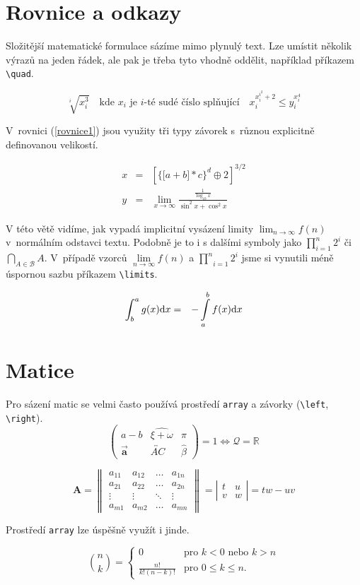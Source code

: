 \documentclass[11pt,a4paper,twocolumn]{article}
\begin{document}
\section{Rovnice a odkazy}
Složitější matematické formulace sázíme mimo plynulý
text. Lze umístit několik výrazů na jeden řádek, ale pak je
třeba tyto vhodně oddělit, například příkazem \verb|\quad|.

$$\sqrt[i]{x^{3}_{i}} \quad\text{kde $x_i$ je $i$-té sudé číslo splňující}
\quad x_{i}^{x_{i}^{i^{2}}+2} \leq y_{i}^{x_{i}^{4}}$$


V~rovnici (\ref{rovnice1}) jsou využity tři typy závorek s~různou
explicitně definovanou velikostí.

\begin{eqnarray}
\label{rovnice1}
x& = &\left[\Big\{\big[a+b\big]*c\Big\}^{d}\oplus{2}\right]^{3/2}\\
y& = &\lim_{x\rightarrow\infty}\frac{\frac{1}{\log_{10}x}}{\sin^{2}x+\cos^{2}x}\nonumber
\end{eqnarray}

V této větě vidíme, jak vypadá implicitní vysázení limity $\lim_{n\rightarrow\infty}f(n)$ v~normálním odstavci textu. Podobně
je to i s dalšími symboly jako $\prod_{i=1}^{n} 2^{i}$ či $\bigcap_{A\in\mathcal{B}}A$.
V~případě vzorců $\lim\limits_{n\rightarrow\infty}f(n)$ a $\underset{i=1}{\overset{n}{\prod}} 2^{i}$
jsme si vynutili méně
úspornou sazbu příkazem \verb|\limits|.

\begin{eqnarray}
\label{rovnice2}
\int_{b}^{a} g(x)\mathrm{d}x&=&-\int\displaylimits_a^{b} f(x) \mathrm{d}x
\end{eqnarray}

\section{Matice}
Pro sázení matic se velmi často používá prostředí \verb|array|
a závorky (\verb|\left|, \verb|\right|).
$$\left(\begin{array}{ccc}
{a-b} & \widehat{\xi+\omega} & \pi\\
{\vec{\mathbf{a}}} & \overleftrightarrow{AC} & \hat{\beta}
\end{array}\right) = 1 \Longleftrightarrow \mathcal{Q} = \mathbb{R}$$

$$\mathbf{A} = \left\|\begin{array}{cccc}
a_{11} & a_{12} & \ldots & a_{1 n}\\
a_{21} & a_{22} & \ldots & a_{2 n}\\
\vdots & \vdots & \ddots & \vdots\\
a_{m 1} & a_{m 2} & \ldots & a_{m n}\end{array}\right
\|=\left|
\begin{array}{cc}
t & u\\
v & w\end{array}
\right|=tw \minus uv$$

Prostředí \verb|array| lze úspěšně využít i jinde.

$$\binom{n}{k}=
\left\{\begin{array}{cl}
0 & \text{pro } k<0 \text{ nebo } k>n\\
\frac{n!}{k!(n-k)!} & \text{pro } 0 \leq{k}\leq{n.}
\end{array}\right.$$
\end{document}
